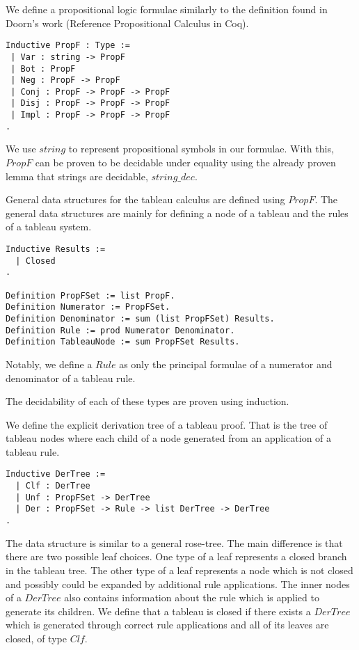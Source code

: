 \documentclass{article}
\begin{document}
We define a propositional logic formulae similarly to the definition found in
Doorn's work (Reference Propositional Calculus in Coq).

\begin{lstlisting}
Inductive PropF : Type :=
 | Var : string -> PropF
 | Bot : PropF
 | Neg : PropF -> PropF
 | Conj : PropF -> PropF -> PropF
 | Disj : PropF -> PropF -> PropF
 | Impl : PropF -> PropF -> PropF
.
\end{lstlisting}

We use $string$ to represent propositional symbols in our formulae. With this,
$PropF$ can be proven to be decidable under equality using the already proven
lemma that strings are decidable, $string\_dec$.

General data structures for the tableau calculus are defined using $PropF$.
The general data structures are mainly for defining a node of a tableau and
the rules of a tableau system.

\begin{lstlisting}
Inductive Results :=
  | Closed
.

Definition PropFSet := list PropF.
Definition Numerator := PropFSet.
Definition Denominator := sum (list PropFSet) Results.
Definition Rule := prod Numerator Denominator.
Definition TableauNode := sum PropFSet Results.
\end{lstlisting}

Notably, we define a $Rule$ as only the principal formulae of a numerator and
denominator of a tableau rule.

The decidability of each of these types are proven using induction.

We define the explicit derivation tree of a tableau proof. That is the tree
of tableau nodes where each child of a node generated from an application of a
tableau rule.

\begin{lstlisting}
Inductive DerTree :=
  | Clf : DerTree
  | Unf : PropFSet -> DerTree
  | Der : PropFSet -> Rule -> list DerTree -> DerTree
.
\end{lstlisting}

The data structure is similar to a general rose-tree. The main difference is
that there are two possible leaf choices.  One type of a leaf represents a
closed branch in the tableau tree. The other type of a leaf represents a node
which is not closed and possibly could be expanded by additional rule
applications. The inner nodes of a $DerTree$ also contains information about
the rule which is applied to generate its children. We define that a tableau
is closed if there exists a $DerTree$ which is generated through correct rule
applications and all of its leaves are closed, of type $Clf$.
\end{document}
